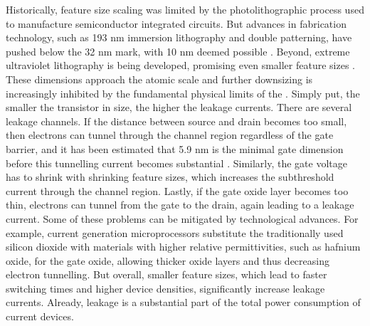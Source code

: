 Historically, feature size scaling was limited by the photolithographic process
used to manufacture semiconductor integrated circuits. But advances in
fabrication technology, such as 193 nm immersion lithography and double
patterning, have pushed below the 32 nm mark, with 10 nm deemed possible
\cite{auth2012, owa2014}. Beyond, extreme ultraviolet lithography is
being developed, promising even smaller feature sizes \cite{wu2007}. These
dimensions approach the atomic scale and further downsizing is increasingly
inhibited by the fundamental physical limits of the . Simply put,
the smaller the transistor in size, the higher the leakage currents. There are
several leakage channels. If the distance between source and drain becomes too
small, then electrons can tunnel through the channel region regardless of the
gate barrier, and it has been estimated that 5.9 nm is the minimal gate
dimension before this tunnelling current becomes substantial
\cite{cavin2012science}. Similarly, the gate voltage has to shrink with
shrinking feature sizes, which increases the subthreshold current through the
channel region. Lastly, if the gate oxide layer becomes too thin, electrons can
tunnel from the gate to the drain, again leading to a leakage current. Some of
these problems can be mitigated by technological advances. For example, current
generation microprocessors substitute the traditionally used silicon dioxide
with materials with higher relative permittivities, such as hafnium oxide, for
the gate oxide, allowing thicker oxide layers and thus decreasing electron
tunnelling. But overall, smaller feature sizes, which lead to faster switching
times and higher device densities, significantly increase leakage currents.
Already, leakage is a substantial part of the total power consumption of current
devices.

